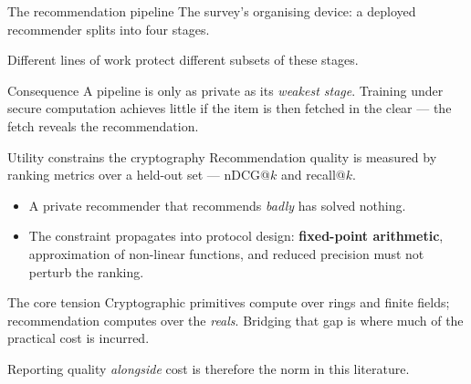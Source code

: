 \documentclass[10pt,aspectratio=169]{beamer}
\begin{document}
\begin{frame}{The recommendation pipeline}
  The survey's organising device: a deployed recommender splits into \alert{four stages}.
 
  \vspace{0.6em}
  \begin{center}
  \end{center}
 
  \vspace{0.3em}
  Different lines of work protect different subsets of these stages.
 
  \begin{alertblock}{Consequence}
    A pipeline is only as private as its \emph{weakest stage}. Training under
    secure computation achieves little if the item is then fetched in the clear ---
    the fetch reveals the recommendation.
  \end{alertblock}
\end{frame}
 
\begin{frame}{Utility constrains the cryptography}
  Recommendation quality is measured by ranking metrics over a held-out set ---
  \alert{nDCG@$k$} and \alert{recall@$k$}.
 
  \begin{itemize}
    \item A private recommender that recommends \emph{badly} has solved nothing.
    \item The constraint propagates into protocol design: \textbf{fixed-point
          arithmetic}, approximation of non-linear functions, and reduced precision
          must not perturb the ranking.
  \end{itemize}
 
  \begin{block}{The core tension}
    Cryptographic primitives compute over rings and finite fields;
    recommendation computes over the \emph{reals}. Bridging that gap is where
    much of the practical cost is incurred.
  \end{block}
 
  Reporting quality \emph{alongside} cost is therefore the norm in this literature.
\end{frame}
 
\end{document}
